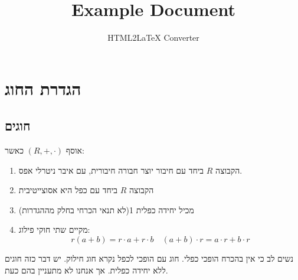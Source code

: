 \documentclass{tstextbook}
\begin{document}
\title{Example Document}
\author{HTML2LaTeX Converter}
\maketitle

\chapter{הגדרת החוג}

\section{חוגים}

\begin{definition}[חוג]
אוסף \(\left( R,+,\cdot \right)\)  כאשר:

  \begin{enumerate}
    \item הקבוצה \(R\) ביחד עם חיבור יוצר חבורה חיבורית, עם איבר ניטרלי אפס. 


    \item הקבוצה \(R\) ביחד עם כפל היא אסוצייטיבית  


    \item מכיל יחידה כפלית 1(לא תנאי הכרחי בחלק מההגדרות) 


    \item מקיים שתי חוקי פילוג: 
$$r(a+b)=r\cdot a+r\cdot b\quad (a+b)\cdot r=a\cdot r+b\cdot r$$


  \end{enumerate}
\end{definition}
נשים לב כי אין בהכרח הופכי כפלי. חוג עם הופכי לכפל נקרא חוג חילוק. יש דבר כזה חוגים ללא יחידה כפלית. אך אנחנו לא מתעניין בהם כעת.
\end{document}
